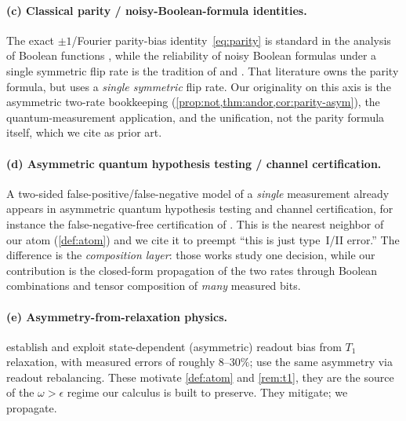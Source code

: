 \documentclass[12pt]{article}
\numberwithin{equation}{section}
\theoremstyle{plain}
\theoremstyle{definition}
\theoremstyle{remark}
\newcommand{\eps}{\epsilon}
\begin{document}
\paragraph{(c) Classical parity / noisy-Boolean-formula identities.}
The exact $\pm1$/Fourier parity-bias identity~\eqref{eq:parity} is standard in the
analysis of Boolean functions \citep{odonnell2014}, while the reliability of noisy
Boolean formulas under a single symmetric flip rate is the tradition of
\citet{vonneumann1956} and \citet{pippenger1988}. That literature owns the parity formula, but
uses a \emph{single symmetric} flip rate. Our originality on this axis is the
asymmetric two-rate bookkeeping (\cref{prop:not,thm:andor,cor:parity-asym}), the
quantum-measurement application, and the unification, not the parity formula
itself, which we cite as prior art.

\paragraph{(d) Asymmetric quantum hypothesis testing / channel certification.}
A two-sided false-positive/false-negative model of a \emph{single} measurement
already appears in asymmetric quantum hypothesis testing and channel
certification, for instance the false-negative-free certification of
\citet{krawiec2021certification}. This is the nearest neighbor of our atom
(\cref{def:atom}) and we cite it to preempt ``this is just type~I/II error.'' The
difference is the \emph{composition layer}: those works study one decision, while
our contribution is the closed-form propagation of the two rates through Boolean
combinations and tensor composition of \emph{many} measured bits.

\paragraph{(e) Asymmetry-from-relaxation physics.}
\citet{tannu2019mitigating} establish and exploit state-dependent (asymmetric)
readout bias from $T_1$ relaxation, with measured errors of roughly $8$--$30\%$;
\citet{hicks2021readout} use the same asymmetry via readout rebalancing. These
motivate \cref{def:atom} and \cref{rem:t1}, they are the source of the $\omega>\eps$
regime our calculus is built to preserve. They mitigate; we propagate.
\end{document}
